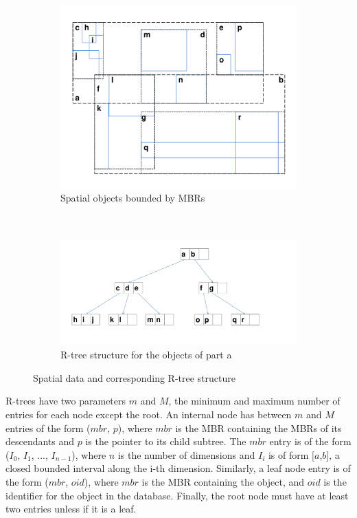 \begin{figure}[t]
	\begin{subfigure}{0.48\textwidth}
		\includegraphics[width=\textwidth]{./figures/R_Tree_objects.pdf}
		\caption{Spatial objects bounded by MBRs}
		\label{fig:R-Tree_objects}
	\end{subfigure}
	~
	\begin{subfigure}{0.48\textwidth}
		\includegraphics[width=\textwidth]{./figures/R_Tree_structure.pdf}
		\caption{R-tree structure for the objects of part a}
		\label{fig:R-Tree_structure}
	\end{subfigure}
	\caption{Spatial data and corresponding R-tree structure}
\end{figure}


R-trees have two parameters $m$ and $M$, the minimum and maximum number
of entries for each node except the root. An internal node has between $m$ and $M$ entries
of the form ($mbr$, $p$), where $mbr$ is the MBR containing the MBRs of its 
descendants and $p$ is the pointer to its child subtree. The $mbr$ entry is of 
the form ($I_{0}$, $I_{1}$, ..., $I_{n-1}$), where $n$ is the number of 
dimensions and $I_{i}$ is of form $[a$,$b]$, a closed bounded interval along 
the i-th dimension. Similarly, a leaf node entry is of the form ($mbr$, $oid$), 
where $mbr$ is the MBR containing the object, and $oid$ is the identifier for the 
object in the database. Finally, the root node must have at least two entries
unless if it is a leaf.

